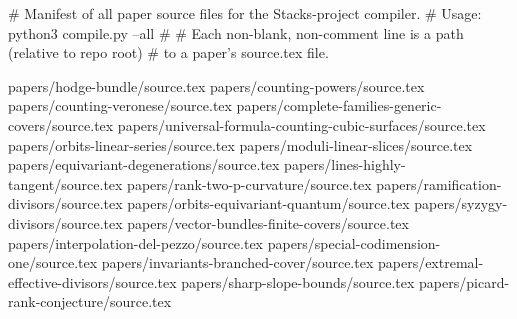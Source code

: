# Manifest of all paper source files for the Stacks-project compiler.
# Usage: python3 compile.py --all
#
# Each non-blank, non-comment line is a path (relative to repo root)
# to a paper's source.tex file.

papers/hodge-bundle/source.tex
papers/counting-powers/source.tex
papers/counting-veronese/source.tex
papers/complete-families-generic-covers/source.tex
papers/universal-formula-counting-cubic-surfaces/source.tex
papers/orbits-linear-series/source.tex
papers/moduli-linear-slices/source.tex
papers/equivariant-degenerations/source.tex
papers/lines-highly-tangent/source.tex
papers/rank-two-p-curvature/source.tex
papers/ramification-divisors/source.tex
papers/orbits-equivariant-quantum/source.tex
papers/syzygy-divisors/source.tex
papers/vector-bundles-finite-covers/source.tex
papers/interpolation-del-pezzo/source.tex
papers/special-codimension-one/source.tex
papers/invariants-branched-cover/source.tex
papers/extremal-effective-divisors/source.tex
papers/sharp-slope-bounds/source.tex
papers/picard-rank-conjecture/source.tex
